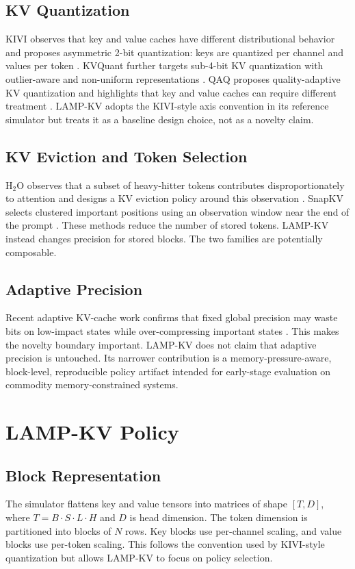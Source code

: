 \documentclass[11pt]{article}
\begin{document}
\subsection{KV Quantization}
KIVI observes that key and value caches have different distributional behavior and proposes asymmetric 2-bit quantization: keys are quantized per channel and values per token \cite{liu2024kivi}. KVQuant further targets sub-4-bit KV quantization with outlier-aware and non-uniform representations \cite{hooper2024kvquant}. QAQ proposes quality-adaptive KV quantization and highlights that key and value caches can require different treatment \cite{dong2024qaq}. LAMP-KV adopts the KIVI-style axis convention in its reference simulator but treats it as a baseline design choice, not as a novelty claim.

\subsection{KV Eviction and Token Selection}
H$_2$O observes that a subset of heavy-hitter tokens contributes disproportionately to attention and designs a KV eviction policy around this observation \cite{zhang2023h2o}. SnapKV selects clustered important positions using an observation window near the end of the prompt \cite{li2024snapkv}. These methods reduce the number of stored tokens. LAMP-KV instead changes precision for stored blocks. The two families are potentially composable.

\subsection{Adaptive Precision}
Recent adaptive KV-cache work confirms that fixed global precision may waste bits on low-impact states while over-compressing important states \cite{boroujeni2026dontwastebits}. This makes the novelty boundary important. LAMP-KV does not claim that adaptive precision is untouched. Its narrower contribution is a memory-pressure-aware, block-level, reproducible policy artifact intended for early-stage evaluation on commodity memory-constrained systems.

\section{LAMP-KV Policy}
\subsection{Block Representation}
The simulator flattens key and value tensors into matrices of shape $[T,D]$, where $T=B\cdot S\cdot L\cdot H$ and $D$ is head dimension. The token dimension is partitioned into blocks of $N$ rows. Key blocks use per-channel scaling, and value blocks use per-token scaling. This follows the convention used by KIVI-style quantization but allows LAMP-KV to focus on policy selection.
\end{document}

